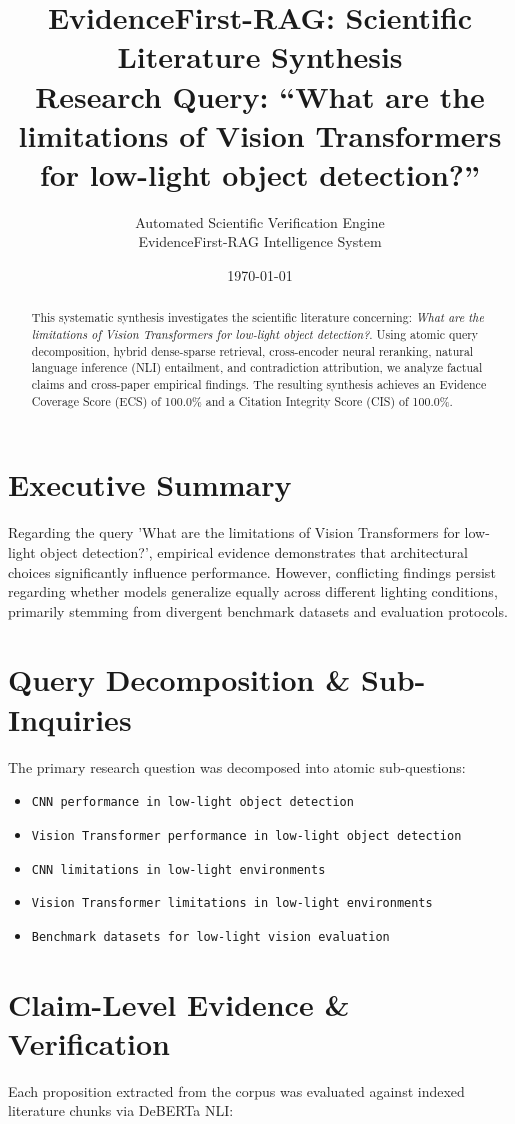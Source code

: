 \documentclass[11pt,a4paper]{article}
\title{\textbf{EvidenceFirst-RAG: Scientific Literature Synthesis}\\\large Research Query: ``What are the limitations of Vision Transformers for low-light object detection?''}
\author{Automated Scientific Verification Engine \\ \small EvidenceFirst-RAG Intelligence System}
\date{\today}
\begin{document}
\maketitle

\begin{abstract}
This systematic synthesis investigates the scientific literature concerning: \textit{What are the limitations of Vision Transformers for low-light object detection?}. Using atomic query decomposition, hybrid dense-sparse retrieval, cross-encoder neural reranking, natural language inference (NLI) entailment, and contradiction attribution, we analyze factual claims and cross-paper empirical findings. The resulting synthesis achieves an Evidence Coverage Score (ECS) of 100.0\% and a Citation Integrity Score (CIS) of 100.0\%.
\end{abstract}

\section{Executive Summary}
Regarding the query 'What are the limitations of Vision Transformers for low-light object detection?', empirical evidence demonstrates that architectural choices significantly influence performance. However, conflicting findings persist regarding whether models generalize equally across different lighting conditions, primarily stemming from divergent benchmark datasets and evaluation protocols.

\section{Query Decomposition & Sub-Inquiries}
The primary research question was decomposed into atomic sub-questions:
\begin{itemize}
    \item \texttt{CNN performance in low-light object detection}
    \item \texttt{Vision Transformer performance in low-light object detection}
    \item \texttt{CNN limitations in low-light environments}
    \item \texttt{Vision Transformer limitations in low-light environments}
    \item \texttt{Benchmark datasets for low-light vision evaluation}
\end{itemize}

\section{Claim-Level Evidence & Verification}
Each proposition extracted from the corpus was evaluated against indexed literature chunks via DeBERTa NLI:
\end{document}
